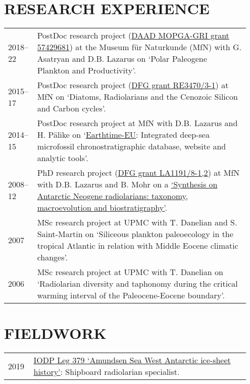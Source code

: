 \documentclass[11pt, a4paper]{article}
\begin{document}
\section{RESEARCH EXPERIENCE}
\begin{longtable}{@{}p{0.1\linewidth} >{\small}P{0.85\linewidth}@{}}
2018--22 & PostDoc research project (\href{https://www.daad.de/medien/hochschulen/regional/europa/mopga/projektbeschreibungen_englisch_15-05-2018.pdf}{DAAD MOPGA-GRI grant 57429681}) at the Museum f\"{u}r Naturkunde (MfN) with G. Asatryan and D.B. Lazarus on `Polar Paleogene Plankton and Productivity'.\\
2015--17 & PostDoc research project (\href{http://gepris.dfg.de/gepris/projekt/279867559}{DFG grant RE3470/3-1}) at MfN on `Diatoms, Radiolarians and the Cenozoic Silicon and Carbon cycles'.\\
2014--15 & PostDoc research project at MfN with D.B. Lazarus and H. P\"{a}like on `\href{http://earthtime-eu.eu/earthtime/?page_id=686}{Earthtime-EU}: Integrated deep-sea microfossil chronostratigraphic database, website and analytic tools'.\\
2008--12 & PhD research project (\href{http://gepris.dfg.de/gepris/projekt/84744046}{DFG grant LA1191/8-1,2}) at MfN with D.B. Lazarus and B. Mohr on a \href{https://doi.org/10.18452/16985}{`Synthesis on Antarctic Neogene radiolarians: taxonomy, macroevolution and biostratigraphy'}.\\
2007 & MSc research project at UPMC with T. Danelian and S. Saint-Martin on `Siliceous plankton paleoecology in the tropical Atlantic in relation with Middle Eocene climatic changes'.\\
2006 & MSc research project at UPMC with T. Danelian on `Radiolarian diversity and taphonomy during the critical warming interval of the Paleocene-Eocene boundary'.\\
\end{longtable}

\section{FIELDWORK}
\begin{longtable}{@{}p{0.1\linewidth} P{0.85\linewidth}@{}}
2019 & \href{https://iodp.tamu.edu/scienceops/expeditions/amundsen_sea_ice_sheet_history.html}{IODP Leg 379 `Amundsen Sea West Antarctic ice-sheet history'}: Shipboard radiolarian specialist.\\
\end{longtable}
\end{document}
